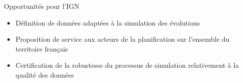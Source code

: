 \documentclass[xcolor=table]{beamer}
\newcommand\FontPetit{\fontsize{8}{6}\selectfont}
\begin{document}
\begin{frame}{Opportunités pour l'IGN}
\begin{itemize}
	\item Définition de données adaptées à la simulation des évolutions
	\item Proposition de service aux acteurs de la planification sur l'ensemble du territoire français
	\item Certification de la robustesse du processus de simulation relativement à la qualité des données
\end{itemize}
\end{frame}
\end{document}
